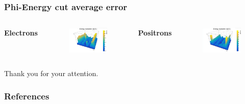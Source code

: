 \documentclass{beamer}
\begin{document}
		\begin{frame}
			\frametitle{Phi-Energy cut average error}
			\begin{columns}
				\centering
				\Large \textbf{Electrons}
				\begin{figure}
					\centering
					\includegraphics[width = 0.95 \linewidth]{../images/c_e_phi_energy_abs.png}
				\end{figure}
				\centering
				\Large \textbf{Positrons}
				\begin{figure}
					\centering
					\includegraphics[width = 0.95 \linewidth]{../images/c_p_phi_energy_abs.png}
				\end{figure}
			\end{columns}
		\end{frame}
	
	{
		\begin{frame}[noframenumbering]{}
			\begin{center}
				\Huge Thank you for your attention.
			\end{center}
		\end{frame}
	}
	
	\begin{frame}
		\frametitle{References}
		
		
	\end{frame}
	
\end{document}
